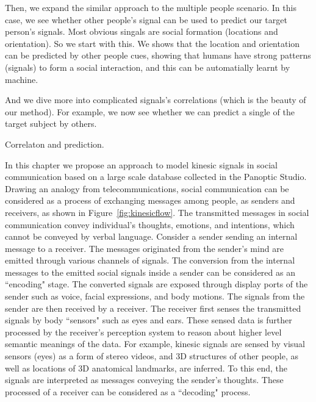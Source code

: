 Then, we expand the similar approach to the multiple people scenario. In this case, we see whether other people's signal can be used to predict our target person's signals. Most obvious singals are social formation (locations and orientation). So we start with this. We shows that the location and orientation can be predicted by other people cues, showing that humans have strong patterns (signals) to form a social interaction, and this can be automatially learnt by machine. 

And we dive more into complicated signals's correlations (which is the beauty of our method). For example, we now see whether we can predict a single of the target subject by others. 




Correlaton and prediction. 









In this chapter we propose an approach to model kinesic signals in social communication based on a large scale database collected in the Panoptic Studio. Drawing an analogy from telecommunications, social communication can be considered as a process of exchanging messages among people, as senders and receivers, as shown in Figure~\ref{fig:kinesicflow}. The transmitted messages in social communication convey individual's thoughts, emotions, and intentions, which cannot be conveyed by verbal language. Consider a sender sending an internal message to a receiver. The messages originated from the sender's mind are emitted through various channels of signals. The conversion from the internal messages to the emitted social signals inside a sender can be considered as an ``encoding" stage. The converted signals are exposed through display ports of the sender such as voice, facial expressions, and body motions. The signals from the sender are then received by a receiver. The receiver first senses the transmitted signals by body ``sensors" such as eyes and ears. These sensed data is further processed by the receiver's perception system to reason about higher level semantic meanings of the data. For example, kinesic signals are sensed by visual sensors (eyes) as a form of stereo videos, and 3D structures of other people, as well as locations of 3D anatomical landmarks, are inferred. To this end, the signals are interpreted as messages conveying the sender's thoughts.  These processed of a receiver can be considered as a ``decoding" process. 

